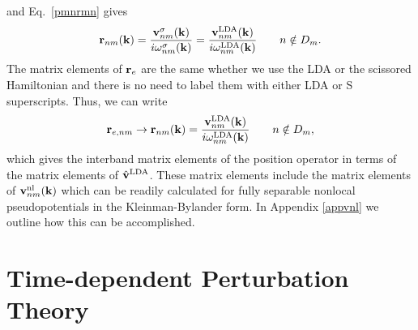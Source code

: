 \documentclass[floatfix,prb,aps,superscriptaddress,11pt,preprint,letterpaper]{revtex4}
\begin{document}
and Eq.~\eqref{pmnrmn} gives
\begin{align}\label{chon.10}
\mathbf{r}_{nm}(\mathbf{k})
=
\frac{\mathbf{v}^\sigma_{nm}(\mathbf{k})}{i\omega^\sigma_{nm}(\mathbf{k})}
=
\frac{\mathbf{v}^{\mathrm{LDA}}_{nm}(\mathbf{k})}{i\omega^{\mathrm{LDA}}_{nm}(\mathbf{k})}
\quad\quad n\notin D_m
.
\end{align}
The matrix elements
of $\mathbf{r}_e$ are the same whether we use the LDA or the scissored
Hamiltonian and there is no need to label them with either LDA
or S superscripts. Thus,
we can write
\begin{equation}\label{chon.98}
\mathbf{r}_{e,nm}\to
\mathbf{r}_{nm}(\mathbf{k})=\frac{\mathbf{v}^{\mathrm{LDA}}_{nm}(\mathbf{k})}{i\omega^{\mathrm{LDA}}_{nm}(\mathbf{k})}
\quad\quad n\notin D_m
,
\end{equation}   
which gives the interband matrix elements of the position operator
in terms of the matrix elements of $\hat{\mathbf{v}}^{\mathrm{LDA}}$. 
These matrix elements include the matrix elements of
$\mathbf{v}^{\mathrm{nl}}_{nm}(\mathbf{k})$ which can be readily calculated\cite{francesco} for 
fully separable nonlocal pseudopotentials in the 
Kleinman-Bylander 
form.\cite{mottaCMS10,kleinman_efficacious_1982,adolphPRB96}
In Appendix \ref{appvnl} we outline how this  
can be accomplished. 

\section{Time-dependent Perturbation Theory}\label{tdpt}
\end{document}
